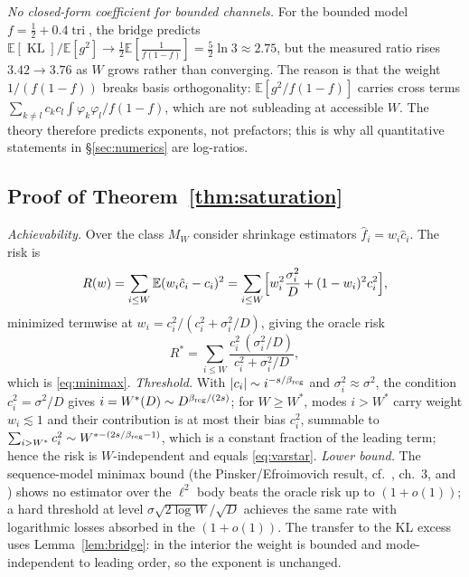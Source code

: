\documentclass[12pt]{article}
\newcommand{\KL}{\operatorname{KL}}
\newcommand{\E}{\mathbb{E}}
\theoremstyle{remark}
\begin{document}
\emph{No closed-form coefficient for bounded channels.} For the bounded model
$f=\tfrac12+0.4\operatorname{tri}$, the bridge predicts
$\E[\KL]/\E[g^2]\to\frac12\E[\frac1{f(1-f)}]=\frac52\ln3\approx2.75$, but the
measured ratio rises $3.42\to3.76$ as $W$ grows rather than converging. The
reason is that the weight $1/(f(1-f))$ breaks basis orthogonality:
$\E[g^2/f(1-f)]$ carries cross terms $\sum_{k\ne l}c_kc_l\int\varphi_k
\varphi_l/f(1-f)$, which are not subleading at accessible $W$. The theory
therefore predicts exponents, not prefactors; this is why all quantitative
statements in \S\ref{sec:numerics} are log-ratios.

\subsection{Proof of Theorem~\ref{thm:saturation}}
\label{app:minimax}
\textit{Achievability.} Over the class $M_W$ consider shrinkage estimators
$\hat f_i=w_i\hat c_i$. The risk is
\begin{equation*}
  R(w)=\sum_{i\le W}\E(w_i\hat c_i-c_i)^2
  =\sum_{i\le W}\Bigl[w_i^2\frac{\sigma_i^2}{D}+(1-w_i)^2 c_i^2\Bigr],
\end{equation*}
minimized termwise at $w_i=c_i^2/(c_i^2+\sigma_i^2/D)$, giving the oracle risk
\begin{equation*}
  R^*=\sum_{i\le W}\frac{c_i^2\,(\sigma_i^2/D)}{c_i^2+\sigma_i^2/D},
\end{equation*}
which is \eqref{eq:minimax}. \textit{Threshold.} With
$|c_i|\sim i^{-s/\beta_{\rm reg}}$ and $\sigma_i^2\approx\sigma^2$, the
condition $c_i^2=\sigma^2/D$ gives $i=W^*(D)\sim D^{\beta_{\rm reg}/(2s)}$;
for $W\ge W^*$, modes $i>W^*$ carry weight $w_i\lesssim1$ and their
contribution is at most their bias $c_i^2$, summable to
$\sum_{i>W^*}c_i^2\sim W^{*-(2s/\beta_{\rm reg}-1)}$, which is a constant
fraction of the leading term; hence the risk is $W$-independent and equals
\eqref{eq:varstar}. \textit{Lower bound.} The sequence-model minimax bound
(the Pinsker/Efroimovich result, cf.\ \citet{tsybakov2009}, ch.~3, and
\citet{pinsker1980}) shows no estimator over the $\ell^2$ body beats the
oracle risk up to
$(1+o(1))$; a hard threshold at level $\sigma\sqrt{2\log W}/\sqrt D$ achieves
the same rate with logarithmic losses absorbed in the $(1+o(1))$. The
transfer to the KL excess uses Lemma~\ref{lem:bridge}: in the interior the
weight is bounded and mode-independent to leading order, so the exponent is
unchanged.
\end{document}
